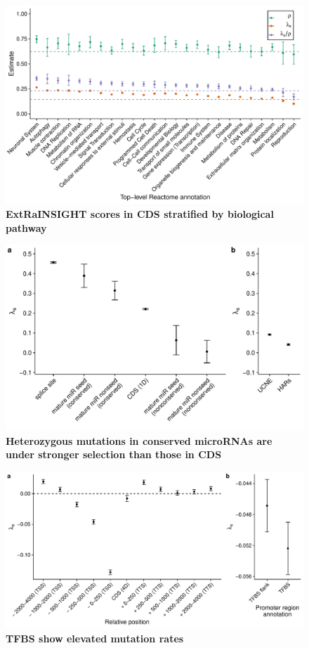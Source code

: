 \documentclass[11pt]{article}
\begin{document}
\begin{figure}[t]
    \centering
    \includegraphics[width=\linewidth]{figures/reactome_cds_ratio.pdf}
    \caption{\textbf{\textbf{ExtRaINSIGHT scores in CDS stratified by biological pathway}}}
    \label{fig:reactome}
\end{figure}

\begin{figure}[t]
    \centering
    \includegraphics[width=\linewidth]{figures/microRNA_constraint.pdf}
    \caption{\textbf{\textbf{Heterozygous mutations in conserved microRNAs are under stronger selection than those in CDS}}}
    \label{fig:micro_rnas}
\end{figure}

\begin{figure}[t]
    \centering
    \includegraphics[width=\linewidth]{figures/excess_mutation_rate.pdf}
    \caption{\textbf{\textbf{TFBS show elevated mutation rates}}}
    \label{fig:mutation_model_misspec}
\end{figure}
\end{document}
